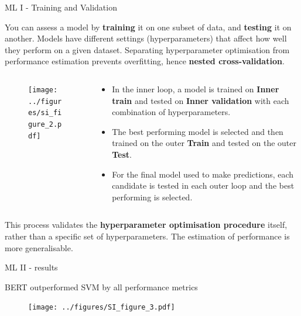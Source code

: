 \documentclass[9pt]{beamer}
\begin{document}
\begin{frame}{ML I - Training and Validation}

\small

You can assess a model by \textbf{training} it on one subset of data, and \textbf{testing} it on another. Models have different settings (hyperparameters) that affect how well they perform on a given dataset. Separating hyperparameter optimisation from performance estimation prevents overfitting, hence \textbf{nested cross-validation}.

\begin{columns}
\begin{column}{0.618\linewidth}
\begin{figure}
\texttt{[image: ../figures/si\_figure\_2.pdf]}
\end{figure}
\end{column}

\begin{column}{0.382\linewidth}
\begin{itemize}
\item In the inner loop, a model is trained on \textbf{Inner train} and tested on \textbf{Inner validation} with each combination of hyperparameters. 
\item The best performing model is selected and then trained on the outer \textbf{Train} and tested on the outer \textbf{Test}. 
\item For the final model used to make predictions, each candidate is tested in each outer loop and the best performing is selected.
\end{itemize}

\end{column}
\end{columns}

\medskip

This process validates the \textbf{hyperparameter optimisation procedure} itself, rather than a specific set of hyperparameters. The estimation of performance is more generalisable.

\end{frame}

\begin{frame}{ML II - results}

BERT outperformed SVM by all performance metrics

\begin{figure}
\texttt{[image: ../figures/SI\_figure\_3.pdf]}
\end{figure}

\end{frame}
\end{document}
